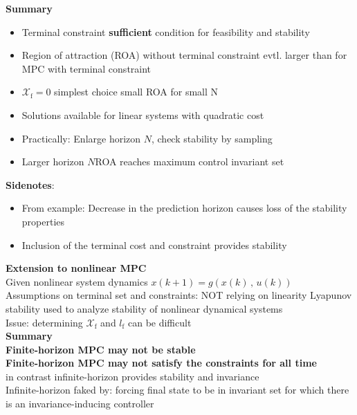 \endgroup
\textbf{Summary}
\begin{itemize}
    \item Terminal constraint \textbf{sufficient} condition for feasibility and stability
    \item Region of attraction (ROA) without terminal constraint evtl. larger than for MPC with terminal constraint
    \item $\mathcal{X}_\text{f}=0$ simplest choice \rightarrow small ROA for small N
    \item Solutions available for linear systems with quadratic cost
    \item Practically: Enlarge horizon $N$, check stability by sampling
    \item Larger horizon $N$\rightarrow ROA reaches maximum control invariant set
\end{itemize}
\textbf{Sidenotes}: 
\begin{itemize}
    \item From example: Decrease in the prediction horizon causes loss of the stability properties
    \item Inclusion of the terminal cost and constraint provides stability
\end{itemize}
\textbf{Extension to nonlinear MPC}\\
Given nonlinear system dynamics $x(k+1)=g(x(k)\,,\,u(k))$\\
\rightarrow Assumptions on terminal set and constraints: NOT relying on linearity
\rightarrow Lyapunov stability used to analyze stability of nonlinear dynamical systems\\
Issue: determining $\mathcal{X}_\text{f}$ and $l_\text{f}$ can be difficult\\
\textbf{Summary}\\
\textbf{Finite-horizon MPC may not be stable}\\
\textbf{Finite-horizon MPC may not satisfy the constraints for all time}\\
\textcolor{red}{\rightarrow} in contrast infinite-horizon provides stability and invariance\\
\textcolor{red}{\rightarrow} Infinite-horizon faked by: forcing final state to be in invariant set for which there is an invariance-inducing controller


\endgroup